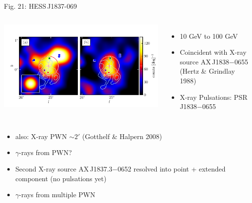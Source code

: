 \documentclass[12pt]{beamer}
\begin{document}
\begin{frame}{Fig. 21: HESS\,J1837-069}
  \begin{columns}
    \includegraphics[scale=0.45]{plots/source_HESS_J1837-069_color.pdf}
    \begin{itemize}
      \item 10 GeV to 100 GeV
      \item Coincident with X-ray source
        AX\,J1838$-$0655 (Hertz \& Grindlay 1988)
      \item X-ray Pulsations: PSR\,J1838$-$0655 
    \end{itemize}
  \end{columns}
    \begin{itemize}
      \item also: X-ray PWN $\sim 2'$ 
        (Gotthelf \& Halpern 2008)
      \item $\gamma$-rays from PWN?
      \item Second X-ray source
        AX\,J1837.3$-$0652 resolved into
        point + extended component (no pulsations yet)
      \item $\gamma$-rays from multiple PWN
    \end{itemize}
\end{frame}
\end{document}
